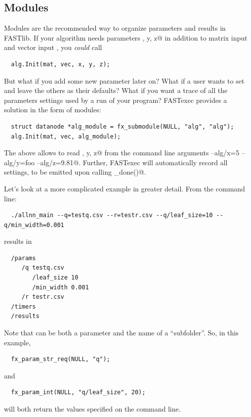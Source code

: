 \documentclass[letter]{report}
\begin{document}
\subsection{Modules}

Modules are the recommended way to organize parameters and results in
FASTlib.  If your algorithm needs parameters \verb@x, y, z@ in
addition to matrix input \verb@mat@ and vector input \verb@vec@, you
{\em could} call
\begin{verbatim}
  alg.Init(mat, vec, x, y, z);
\end{verbatim}
But what if you add some new parameter \verb@w@ later on?  What if a
user wants to set \verb@z@ and leave the others as their defaults?
What if you want a trace of all the parameters settings used by a run
of your program?  FASTexec provides a solution in the form of modules:
\begin{verbatim}
  struct datanode *alg_module = fx_submodule(NULL, "alg", "alg");
  alg.Init(mat, vec, alg_module);
\end{verbatim}
The above allows \verb@alg@ to read \verb@x, y, z@ from the command
line arguments \verb@--alg/x=5 --alg/y=foo --alg/z=9.81@.  Further,
FASTexec will automatically record all settings, to be emitted upon
calling \verb@fx_done()@.

Let's look at a more complicated example in greater detail.  From the command line:
\begin{verbatim}
  ./allnn_main --q=testq.csv --r=testr.csv --q/leaf_size=10 --q/min_width=0.001
\end{verbatim}
results in
\begin{verbatim}
  /params
     /q testq.csv
        /leaf_size 10
        /min_width 0.001
     /r testr.csv
  /timers
  /results
\end{verbatim}
Note that \verb@q@ can be both a parameter and the name of a ``subfolder''.  So, in this example,
\begin{verbatim}
  fx_param_str_req(NULL, "q");
\end{verbatim}
and
\begin{verbatim}
  fx_param_int(NULL, "q/leaf_size", 20);
\end{verbatim}
will both return the values specified on the command line.  
\end{document}
